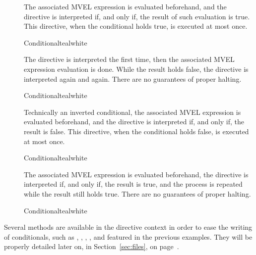 \begin{description}
\item[] The associated MVEL expression is evaluated beforehand, and the directive is interpreted if, and only if, the result of such evaluation is true. This directive, when the conditional holds true, is executed at most once.

\begin{codebox}{Conditional}{teal}{\icnote}{white}
\end{codebox}

\item[] The directive is interpreted the first time, then the associated MVEL expression evaluation is done. While the result holds false, the directive is interpreted again and again. There are no guarantees of proper halting.

\begin{codebox}{Conditional}{teal}{\icnote}{white}
\end{codebox}

\item[] Technically an inverted  conditional, the associated MVEL expression is evaluated beforehand, and the directive is interpreted if, and only if, the result is false. This directive, when the conditional holds false, is executed at most once.

\begin{codebox}{Conditional}{teal}{\icnote}{white}
\end{codebox}

\item[] The associated MVEL expression is evaluated beforehand, the directive is interpreted if, and only if, the result is true, and the process is repeated while the result still holds true. There are no guarantees of proper halting.

\begin{codebox}{Conditional}{teal}{\icnote}{white}
\end{codebox}
\end{description}

Several methods are available in the directive context in order to ease the writing of conditionals, such as , , , , and  featured in the previous examples. They will be properly detailed later on, in Section~\ref{sec:files}, on page~\pageref{sec:files}.

